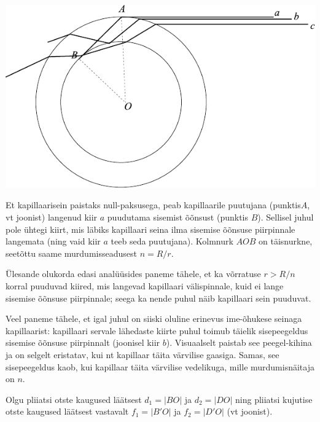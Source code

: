 \documentclass[10pt]{article}
\begin{document}
{%

\solu
\begin{center}
	\includegraphics[width=\linewidth]{2009-lahg-08-lah}
\end{center}

Et kapillaarisein paistaks null-paksusega, peab kapillaarile puutujana (punktis$A$, vt joonist) langenud kiir $a$ puudutama sisemist õõnsust (punktis $B$). Sellisel juhul pole ühtegi kiirt, mis läbiks kapillaari seina ilma sisemise õõnsuse piirpinnale langemata (ning vaid kiir $a$ teeb seda puutujana). Kolmnurk $AOB$ on täisnurkne, seetõttu saame murdumisseadusest $n= R/r$. 

Ülesande olukorda edasi analüüsides paneme tähele, et ka võrratuse $r> R/n$ korral puuduvad kiired, mis langevad kapillaari välispinnale, kuid ei lange sisemise õõnsuse piirpinnale; seega ka nende puhul näib kapillaari sein puuduvat. 

Veel paneme tähele, et igal juhul on siiski oluline erinevus ime-õhukese seinaga kapillaarist: kapillaari servale lähedaste kiirte puhul toimub täielik sisepeegeldus sisemise õõnsuse piirpinnalt (joonisel kiir $b$). Visuaalselt paistab see peegel-kihina ja on selgelt eristatav, kui nt kapillaar täita värvilise gaasiga. Samas, see sisepeegeldus kaob, kui kapillaar täita värvilise vedelikuga, mille murdumisnäitaja on $n$.
\probend
\bigskip


\solu
Olgu pliiatsi otste kaugused läätsest $d_1 = |BO|$ ja $d_2 = |DO|$ ning pliiatsi kujutise otste kaugused läätsest vastavalt $f_1 = |B'O|$ ja $f_2 = |D'O|$ (vt joonist).

}
\end{document}
